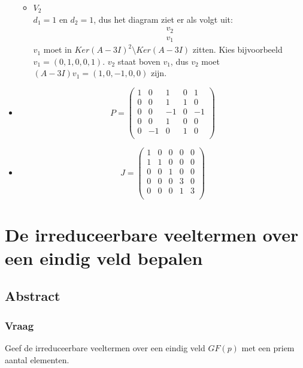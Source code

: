 \documentclass[main.tex]{subfiles}
\begin{document}
\begin{itemize}
\begin{itemize}
  \item $V_{2}$\\
    $d_{1} = 1$ en $d_{2} = 1$, dus het diagram ziet er als volgt uit:
    \[
    \begin{array}{c}
      \boxed{v_{2}}\\
      \boxed{v_{1}}
    \end{array}
    \]
    $v_{1}$ moet in $Ker(A-3I)^{2}\setminus Ker(A-3I)$ zitten.
    Kies bijvoorbeeld $v_{1}= (0,1,0,0,1)$.
    $v_{2}$ staat boven $v_{1}$, dus $v_{2}$ moet $(A-3I)v_{1}= (1,0,-1,0,0)$ zijn.

  \end{itemize}
\item 
  \[ P = 
  \left(
    \begin{array}{ccc|cc}
      1 & 0 & 1 & 0 & 1\\
      0 & 0 & 1 & 1 & 0\\
      0 & 0 & -1& 0 &-1\\
      0 & 0 & 1 & 0 & 0\\
      0 & -1& 0 & 1 & 0\\
    \end{array}
  \right)
  \]
\item 
  \[ J =
  \left(
    \begin{array}{ccc|cc}
      1 & 0 & 0 & 0 & 0\\
      1 & 1 & 0 & 0 & 0\\
      0 & 0 & 1 & 0 & 0\\\hline
      0 & 0 & 0 & 3 & 0\\
      0 & 0 & 0 & 1 & 3\\
    \end{array}
  \right)
  \]
\end{itemize}

\newpage

\section{De irreduceerbare veeltermen over een eindig veld bepalen}

\subsection*{Abstract}
\subsubsection*{Vraag}
Geef de irreduceerbare veeltermen over een eindig veld $GF(p)$ met een priem aantal elementen.
\end{document}
